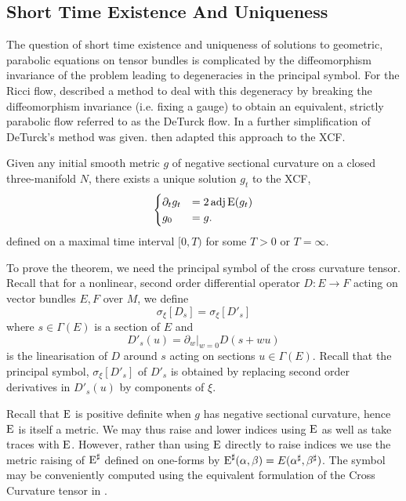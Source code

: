 \documentclass[a4paper,12pt]{amsart}
\begin{document}
\subsection{Short Time Existence And Uniqueness}
\label{subsec:xcf_existence_uniqueness}

The question of short time existence and uniqueness of solutions to geometric, parabolic equations on tensor bundles is complicated by the diffeomorphism invariance of the problem leading to degeneracies in the principal symbol. For the Ricci flow, \cite{MR697987} described a method to deal with this degeneracy by breaking the diffeomorphism invariance (i.e. fixing a gauge) to obtain an equivalent, strictly parabolic flow referred to as the DeTurck flow. In \cite[Section 6]{MR1375255} a further simplification of DeTurck's method was given. \cite{MR2207496} then adapted this approach to the XCF.

\begin{thm}
\label{thm:xcf_existence_uniqueness}
Given any initial smooth metric \(g\) of negative sectional curvature on a closed three-manifold \(N\), there exists a unique solution \(g_t\) to the XCF,
\[
\begin{cases}
\partial_t g_t &= 2\operatorname{adj}\operatorname{E}(g_t) \\
g_0 &= g.
\end{cases}
\]
defined on a maximal time interval \([0, T)\) for some \(T > 0\) or \(T = \infty\).
\end{thm}

To prove the theorem, we need the principal symbol of the cross curvature tensor. Recall that for a nonlinear, second order differential operator \(D : E \to F\) acting on vector bundles \(E, F\) over \(M\), we define
\begin{equation}
\label{eq:symbol}
\sigma_{\xi} [D_s] = \sigma_{\xi} [D'_s]
\end{equation}
where \(s \in \Gamma(E)\) is a section of \(E\) and
\[
D'_s (u) = \partial_w|_{w=0} D(s + w u)
\]
is the linearisation of \(D\) around \(s\) acting on sections \(u \in \Gamma(E)\). Recall that the principal symbol, \(\sigma_{\xi} [D'_s]\) of \(D'_s\) is obtained by replacing second order derivatives in \(D'_s (u)\) by components of \(\xi\).

Recall that \(\operatorname{E}\) is positive definite when \(g\) has negative sectional curvature, hence \(\operatorname{E}\) is itself a metric. We may thus raise and lower indices using \(\operatorname{E}\) as well as take traces with \(\operatorname{E}\). However, rather than using \(\operatorname{E}\) directly to raise indices we use the metric raising of \(\operatorname{E}^{\sharp}\) defined on one-forms by \(\operatorname{E}^{\sharp} (\alpha, \beta) = E(\alpha^{\sharp}, \beta^{\sharp})\). The symbol may be conveniently computed using the equivalent formulation of the Cross Curvature tensor in .
\end{document}
